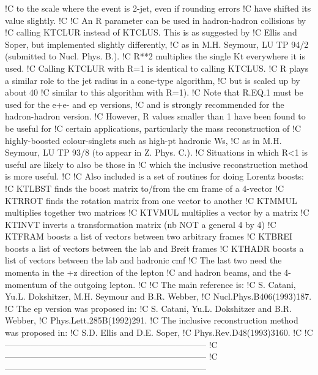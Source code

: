 !C     to the scale where the event is 2-jet, even if rounding errors
!C     have shifted its value slightly.
!C
!C     An R parameter can be used in hadron-hadron collisions by
!C     calling KTCLUR instead of KTCLUS.  This is as suggested by
!C     Ellis and Soper, but implemented slightly differently,
!C     as in M.H. Seymour, LU TP 94/2 (submitted to Nucl. Phys. B.).
!C     R**2 multiplies the single Kt everywhere it is used.
!C     Calling KTCLUR with R=1 is identical to calling KTCLUS.
!C     R plays a similar role to the jet radius in a cone-type algorithm,
!C     but is scaled up by about 40%
!C     similar to this algorithm with R=1).
!C     Note that R.EQ.1 must be used for the e+e- and ep versions,
!C     and is strongly recommended for the hadron-hadron version.
!C     However, R values smaller than 1 have been found to be useful for
!C     certain applications, particularly the mass reconstruction of
!C     highly-boosted colour-singlets such as high-pt hadronic Ws,
!C     as in M.H. Seymour, LU TP 93/8 (to appear in Z. Phys. C.).
!C     Situations in which R<1 is useful are likely to also be those in
!C     which the inclusive reconstruction method is more useful.
!C
!C     Also included is a set of routines for doing Lorentz boosts:
!C     KTLBST finds the boost matrix to/from the cm frame of a 4-vector
!C     KTRROT finds the rotation matrix from one vector to another
!C     KTMMUL multiplies together two matrices
!C     KTVMUL multiplies a vector by a matrix
!C     KTINVT inverts a transformation matrix (nb NOT a general 4 by 4)
!C     KTFRAM boosts a list of vectors between two arbitrary frames
!C     KTBREI boosts a list of vectors between the lab and Breit frames
!C     KTHADR boosts a list of vectors between the lab and hadronic cmf
!C       The last two need the momenta in the +z direction of the lepton
!C       and hadron beams, and the 4-momentum of the outgoing lepton.
!C
!C     The main reference is:
!C       S. Catani, Yu.L. Dokshitzer, M.H. Seymour and B.R. Webber,
!C         Nucl.Phys.B406(1993)187.
!C     The ep version was proposed in:
!C       S. Catani, Yu.L. Dokshitzer and B.R. Webber,
!C         Phys.Lett.285B(1992)291.
!C     The inclusive reconstruction method was proposed in:
!C       S.D. Ellis and D.E. Soper,
!C         Phys.Rev.D48(1993)3160.
!C
!C-----------------------------------------------------------------------
!C-----------------------------------------------------------------------
!C-----------------------------------------------------------------------
\nwendcode{}\endmoddef
